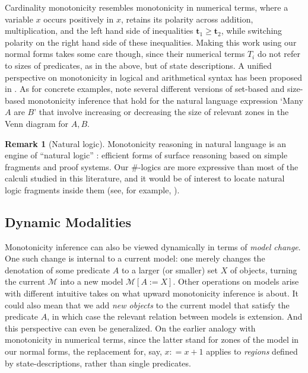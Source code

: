 \documentclass[12pt,oneside,reqno]{amsart}
\theoremstyle{definition}
\newtheorem{remark}{Remark}
\begin{document}
Cardinality monotonicity resembles monotonicity in numerical terms, where a variable $x$ occurs positively in $x$, retains its polarity across addition, multiplication, and the left hand side of inequalities $\mathbf{t}_1 \geq \mathbf{t}_2$, while switching polarity on the right hand side of these inequalities. Making this work using our normal forms takes some care though, since their numerical terms $T_i$ do not refer to sizes of predicates, as in the above, but of state descriptions.  A unified perspective on monotonicity in logical and arithmetical syntax has  been proposed in \cite{IcardMoss2014}. As for concrete examples,  \cite{vanBenthemLiu} note several different versions of set-based and size-based monotonicity inference that hold for the natural language expression `Many $A$ are $B$' that involve increasing or decreasing the size of relevant zones in the Venn diagram for $A, B$.

\begin{remark}[Natural logic] Monotonicity reasoning in natural language is an engine of ``natural logic'' \citep{vanBenthem1985,Sanchez91,Moss2015}: efficient forms of surface reasoning based on simple fragments and proof systems. Our $\#$-logics are more expressive than most of the calculi studied in this literature, and it would be of interest to locate natural logic fragments inside them (see, for example,  \citealt{Hartmann2008,Hartmann2009,Moss2016,moss_topal_2020,KisbyMoss}).
\end{remark}





\subsection{Dynamic Modalities} 

Monotonicity inference can also be viewed dynamically in terms of {\it model change}. One such change is internal to a current model: one merely changes the denotation of some predicate $A$ to a larger (or smaller) set $X$ of objects, turning the current $\mathcal{M}$ into a new model  $\mathcal{M}[A:= X]$. Other operations on models arise with different intuitive takes on what upward monotonicity inference is about. It could also mean that we add \emph{new objects} to the current model that satisfy the predicate $A$, in which case the relevant relation between models is extension. And this perspective can even be generalized. On the earlier analogy with monotonicity in numerical terms, since the latter stand for zones of the model in our normal forms, the replacement for, say, $x : = x + 1$ applies to \emph{regions} defined by state-descriptions, rather than single predicates.
\end{document}
